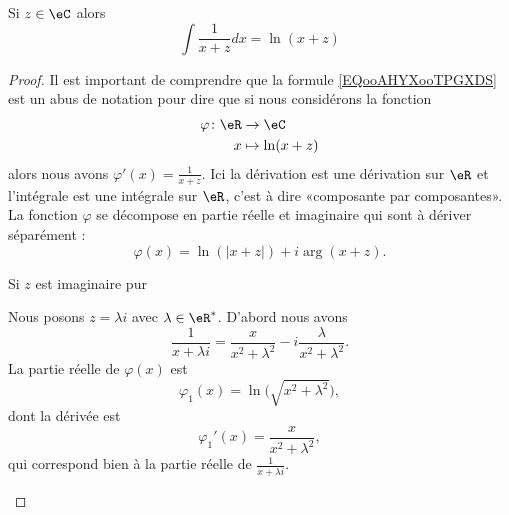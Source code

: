 \begin{proposition}     \label{PROPooNIJVooKueuYJ}
    Si \( z\in \eC\) alors
    \begin{equation}        \label{EQooAHYXooTPGXDS}
        \int\frac{1}{ x+z }dx=\ln(x+z)
    \end{equation}
\end{proposition}

\begin{proof}
    Il est important de comprendre que la formule \eqref{EQooAHYXooTPGXDS} est un abus de notation pour dire que si nous considérons la fonction
    \begin{equation}
        \begin{aligned}
            \varphi\colon \eR&\to \eC \\
            x&\mapsto \ln(x+z)
        \end{aligned}
    \end{equation}
    alors nous avons \( \varphi'(x)=\frac{1}{ x+z }\). Ici la dérivation est une dérivation sur \( \eR\) et l'intégrale est une intégrale sur \( \eR\), c'est à dire «composante par composantes». La fonction \(  \varphi\) se décompose en partie réelle et imaginaire qui sont à dériver séparément :
    \begin{equation}
        \varphi(x)=\ln(| x+z |)+i\arg(x+z).
    \end{equation}

    \begin{subproof}

        \item[Si \( z\) est imaginaire pur]

            Nous posons \( z=\lambda i\) avec \( \lambda\in \eR^*\). D'abord nous avons
            \begin{equation}
                \frac{1}{ x+\lambda i }=\frac{ x }{ x^2+\lambda^2 }-i\frac{ \lambda }{ x^2+\lambda^2 }.
            \end{equation}
            La partie réelle de \( \varphi(x)\) est
            \begin{equation}
                \varphi_1(x)=\ln\big( \sqrt{ x^2+\lambda^2 } \big),
            \end{equation}
            dont la dérivée est
            \begin{equation}
                \varphi_1'(x)=\frac{ x }{ x^2+\lambda^2 },
            \end{equation}
            qui correspond bien à la partie réelle de \( \frac{1}{ x+\lambda i }\).


\end{subproof}
\end{proof}
